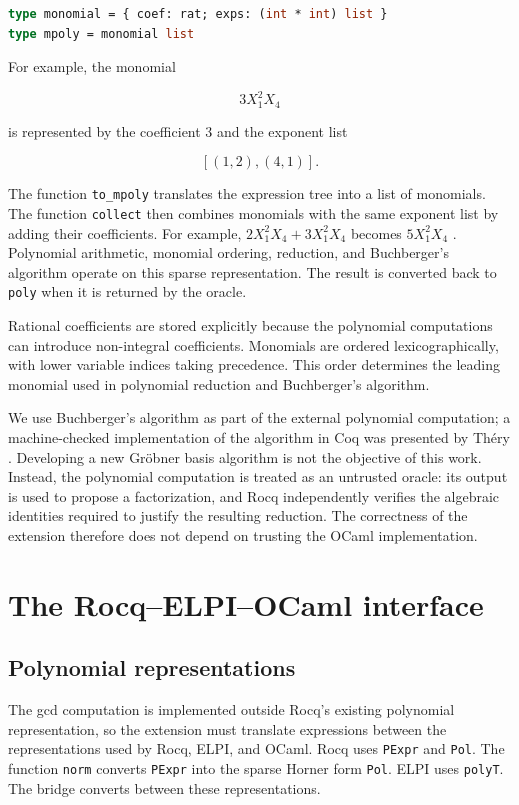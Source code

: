 \documentclass[11pt]{article}
\begin{document}
\begin{lstlisting}[language=ML]
type monomial = { coef: rat; exps: (int * int) list }
type mpoly = monomial list
\end{lstlisting}

For example, the monomial

$$
  3X_1^2X_4
$$

is represented by the coefficient $3$ and the exponent list

$$
  [(1,2),(4,1)].
$$

The function \texttt{to\_mpoly} translates the expression tree into a list of monomials. The function \texttt{collect} then combines monomials with the same exponent list by adding their coefficients.
For example, $2X_1^2X_4 + 3X_1^2X_4$ becomes $5X_1^2X_4$ .
Polynomial arithmetic, monomial ordering, reduction, and Buchberger's
algorithm operate on this sparse representation. The result is converted back
to \texttt{poly} when it is returned by the oracle.

Rational coefficients are stored explicitly because the polynomial
computations can introduce non-integral coefficients. Monomials are ordered
lexicographically, with lower variable indices taking precedence. This order
determines the leading monomial used in polynomial reduction and
Buchberger's algorithm.


We use Buchberger's algorithm as part of the external polynomial computation; a machine-checked implementation of the algorithm in Coq was presented by Théry \cite{thery2001machine}. Developing a new Gröbner basis algorithm is not the objective of this work. Instead, the polynomial computation is treated as an untrusted oracle: its output is used to propose a factorization, and Rocq independently verifies the algebraic identities required to justify the resulting reduction. The correctness of the extension therefore does not depend on trusting the OCaml implementation.


\section{The Rocq--ELPI--OCaml interface}
\subsection{Polynomial representations}


The gcd computation is implemented outside Rocq's existing polynomial representation, so the extension must translate expressions between the representations used by Rocq, ELPI, and OCaml.
Rocq uses \texttt{PExpr} and \texttt{Pol}. The function \texttt{norm} converts
\texttt{PExpr} into the sparse Horner form \texttt{Pol}. ELPI uses
\texttt{polyT}. The bridge converts between these representations.
\end{document}
